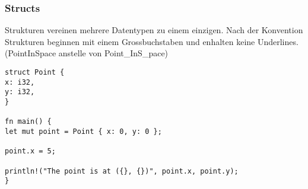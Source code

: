 \subsubsection{Structs}

Strukturen vereinen mehrere Datentypen zu einem einzigen. Nach der Konvention Strukturen beginnen mit einem Grossbuchstaben und enhalten keine Underlines. (PointInSpace anstelle von Point\_InS\_pace) 

\begin{lstlisting}
struct Point {
x: i32,
y: i32,
}

fn main() {
let mut point = Point { x: 0, y: 0 };

point.x = 5;

println!("The point is at ({}, {})", point.x, point.y);
}
\end{lstlisting}